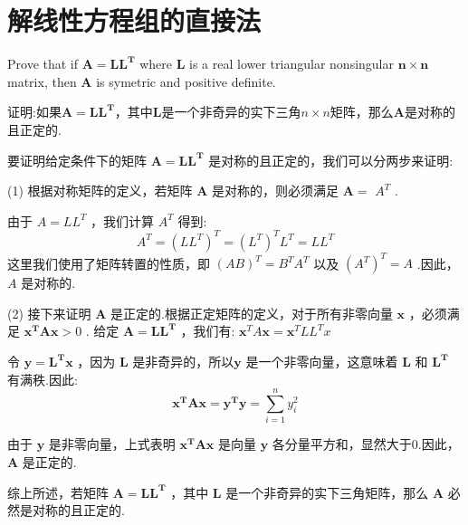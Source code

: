 \newpage
\section{解线性方程组的直接法}
\begin{tcolorbox}[breakable,enhanced,arc=0mm,outer arc=0mm,
		boxrule=0pt,toprule=1pt,leftrule=0pt,bottomrule=1pt, rightrule=0pt,left=0.2cm,right=0.2cm,
		titlerule=0.5em,toptitle=0.1cm,bottomtitle=-0.1cm,top=0.2cm,
		colframe=white!10!biru,colback=white!90!biru,coltitle=white,
            coltext=black,title =2024-04-02, title style={white!10!biru}, before skip=8pt, after skip=8pt,before upper=\hspace{2em},
		fonttitle=\bfseries,fontupper=\normalsize]
  
Prove that if $ \boldsymbol{A}=\boldsymbol{L L}^{\boldsymbol{T}} $ where $ \boldsymbol{L} $ is a real lower triangular nonsingular $ \boldsymbol{n} \times \boldsymbol{n} $ matrix, then $ \boldsymbol{A} $ is symetric and positive definite.

证明:如果$ \boldsymbol{A}=\boldsymbol{L L}^{\boldsymbol{T}} $，其中$ \boldsymbol{L} $是一个非奇异的实下三角$ n \times n $矩阵，那么$ \boldsymbol{A} $是对称的且正定的.
 \tcblower

要证明给定条件下的矩阵 $ \boldsymbol{A}=\boldsymbol{L} \boldsymbol{L}^{\boldsymbol{T}} $ 是对称的且正定的，我们可以分两步来证明:

(1) 根据对称矩阵的定义，若矩阵 $ \boldsymbol{A} $ 是对称的，则必须满足 $ \boldsymbol{A}= $ $ A^{T} $ .

由于 $ A=L L^{T} $ ，我们计算 $ A^{T} $ 得到:
$$
A^{T}=\left(L L^{T}\right)^{T}=\left(L^{T}\right)^{T} L^{T}=L L^{T}
$$
这里我们使用了矩阵转置的性质，即 $ (A B)^{T}=B^{T} A^{T} $ 以及 $ \left(A^{T}\right)^{T}=A $ .因此， $ A $ 是对称的.

(2) 接下来证明 $ \boldsymbol{A} $ 是正定的.根据正定矩阵的定义，对于所有非零向量 $ \boldsymbol{x} $ ，必须满足 $ \boldsymbol{x}^{\boldsymbol{T}} \boldsymbol{A x}>0 $ .
给定 $ \boldsymbol{A}=\boldsymbol{L} \boldsymbol{L}^{\boldsymbol{T}} $ ，我们有:
$ \boldsymbol{x}^{T} A \boldsymbol{x}=\boldsymbol{x}^{T} L L^{T} x $

令 $ \boldsymbol{y}=\boldsymbol{L}^{\boldsymbol{T}} \boldsymbol{x} $ ，因为 $ \boldsymbol{L} $ 是非奇异的，所以$\boldsymbol{y} $ 是一个非零向量，这意味着 $ \boldsymbol{L} $ 和 $ \boldsymbol{L}^{\boldsymbol{T}} $ 有满秩.因此:
$$
\boldsymbol{x}^{\boldsymbol{T}} \boldsymbol{A} \boldsymbol{x}=\boldsymbol{y}^{\boldsymbol{T}} \boldsymbol{y}=\sum_{i=1}^{n} y_{i}^{2}
$$

由于 $ \boldsymbol{y} $ 是非零向量，上式表明 $ \boldsymbol{x}^{\boldsymbol{T}} \boldsymbol{A} \boldsymbol{x} $ 是向量 $ \boldsymbol{y} $ 各分量平方和，显然大于0.因此， $ \boldsymbol{A} $ 是正定的.

综上所述，若矩阵 $ \boldsymbol{A}=\boldsymbol{L} \boldsymbol{L}^{\boldsymbol{T}} $ ，其中 $ \boldsymbol{L} $ 是一个非奇异的实下三角矩阵，那么 $ \boldsymbol{A} $ 必然是对称的且正定的.
\end{tcolorbox}




